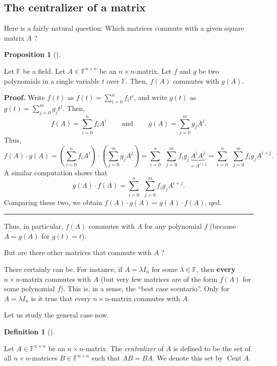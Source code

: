 \documentclass[numbers=enddot,12pt,final,onecolumn,notitlepage]{scrartcl}%
\numberwithin{exer}{subsection}
\theoremstyle{definition}
\newtheorem{prop}[theo]{Proposition}
\newenvironment{proposition}[1][]
{\begin{prop}[#1]\begin{leftbar}}
{\end{leftbar}\end{prop}}
\newtheorem{defi}[theo]{Definition}
\newenvironment{definition}[1][]
{\begin{defi}[#1]\begin{leftbar}}
{\end{leftbar}\end{defi}}
\newenvironment{proof}[1][Proof]{\noindent\textbf{#1.} }{\ \rule{0.5em}{0.5em}}
\let\sumnonlimits\sum
\renewcommand{\sum}{\sumnonlimits\limits}
\begin{document}
\subsection{The centralizer of a matrix}

Here is a fairly natural question: Which matrices commute with a given square
matrix $A$ ?

\begin{proposition}
Let $\mathbb{F}$ be a field. Let $A\in\mathbb{F}^{n\times n}$ be an $n\times
n$-matrix. Let $f$ and $g$ be two polynomials in a single variable $t$ over
$\mathbb{F}$. Then, $f\left(  A\right)  $ commutes with $g\left(  A\right)  $.
\end{proposition}

\begin{proof}
Write $f\left(  t\right)  $ as $f\left(  t\right)  =\sum_{i=0}^{n}f_{i}t^{i}$,
and write $g\left(  t\right)  $ as $g\left(  t\right)  =\sum_{j=0}^{m}%
g_{j}t^{j}$. Then,%
\[
f\left(  A\right)  =\sum_{i=0}^{n}f_{i}A^{i}\ \ \ \ \ \ \ \ \ \ \text{and}%
\ \ \ \ \ \ \ \ \ \ g\left(  A\right)  =\sum_{j=0}^{m}g_{j}A^{j}.
\]
Thus,%
\[
f\left(  A\right)  \cdot g\left(  A\right)  =\left(  \sum_{i=0}^{n}f_{i}%
A^{i}\right)  \cdot\left(  \sum_{j=0}^{m}g_{j}A^{j}\right)  =\sum_{i=0}%
^{n}\ \ \sum_{j=0}^{m}f_{i}g_{j}\underbrace{A^{i}A^{j}}_{=A^{i+j}}=\sum
_{i=0}^{n}\ \ \sum_{j=0}^{m}f_{i}g_{j}A^{i+j}.
\]
A similar computation shows that%
\[
g\left(  A\right)  \cdot f\left(  A\right)  =\sum_{i=0}^{n}\ \ \sum_{j=0}%
^{m}f_{i}g_{j}A^{i+j}.
\]
Comparing these two, we obtain $f\left(  A\right)  \cdot g\left(  A\right)
=g\left(  A\right)  \cdot f\left(  A\right)  $, qed.
\end{proof}

Thus, in particular, $f\left(  A\right)  $ commutes with $A$ for any
polynomial $f$ (because $A=g\left(  A\right)  $ for $g\left(  t\right)  =t$).

But are there other matrices that commute with $A$ ?

There certainly can be. For instance, if $A=\lambda I_{n}$ for some
$\lambda\in\mathbb{F}$, then \textbf{every} $n\times n$-matrix commutes with
$A$ (but very few matrices are of the form $f\left(  A\right)  $ for some
polynomial $f$). This is, in a sense, the \textquotedblleft best case
scentario\textquotedblright. Only for $A=\lambda I_{n}$ is it true that every
$n\times n$-matrix commutes with $A$.

Let us study the general case now.

\begin{definition}
Let $A\in\mathbb{F}^{n\times n}$ be an $n\times n$-matrix. The
\emph{centralizer} of $A$ is defined to be the set of all $n\times n$-matrices
$B\in\mathbb{F}^{n\times n}$ such that $AB=BA$. We denote this set by
$\operatorname*{Cent}A$.
\end{definition}
\end{document}
